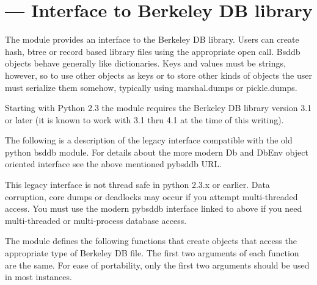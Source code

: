 \section{ ---
         Interface to Berkeley DB library}



The  module provides an interface to the Berkeley DB
library.  Users can create hash, btree or record based library files
using the appropriate open call. Bsddb objects behave generally like
dictionaries.  Keys and values must be strings, however, so to use
other objects as keys or to store other kinds of objects the user must
serialize them somehow, typically using marshal.dumps or pickle.dumps.

Starting with Python 2.3 the  module requires the
Berkeley DB library version 3.1 or later (it is known to work with 3.1
thru 4.1 at the time of this writing).

\begin{seealso}
\end{seealso}

The following is a description of the legacy  interface
compatible with the old python bsddb module.  For details about the more
modern Db and DbEnv object oriented interface see the above mentioned
pybsddb URL.

\begin{notice}[warning]
This legacy interface is not thread safe in python 2.3.x or earlier.  
Data corruption, core dumps or deadlocks may occur if you attempt 
multi-threaded access.  You must use the modern pybsddb interface 
linked to above if you need multi-threaded or multi-process database 
access.
\end{notice}

The  module defines the following functions that create
objects that access the appropriate type of Berkeley DB file.  The
first two arguments of each function are the same.  For ease of
portability, only the first two arguments should be used in most
instances.

